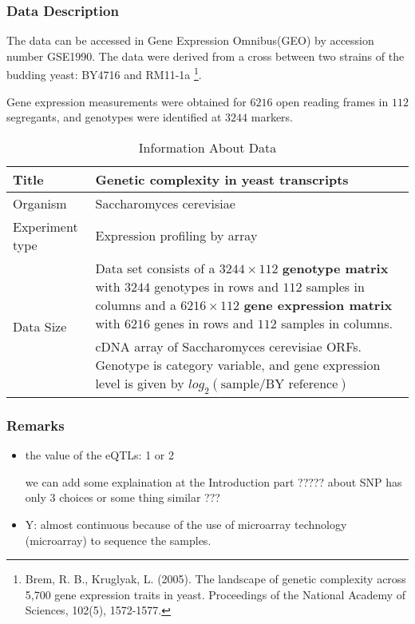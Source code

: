 \begin{frame}\frametitle{Data Description}
    The data can be accessed in Gene Expression Omnibus(GEO) by accession number GSE1990. 
    The data were derived from a cross between two strains of the budding yeast: BY4716 and RM11-1a \footnote[1]{Brem, R. B., Kruglyak, L. (2005). The landscape of genetic complexity across 5,700 gene expression traits in yeast. Proceedings of the National Academy of Sciences, 102(5), 1572-1577.}. 

    Gene expression measurements were obtained for $6216$ open reading frames in $112$ segregants, and genotypes were identified at $3244$ markers. 

\end{frame}

\begin{frame}
    \begin{table}[h]
        \centering
        \begin{tabular}{|l|p{7cm}|}
            \hline
            Title                           &   Genetic complexity in yeast transcripts \\ \hline
            Organism                        &   Saccharomyces cerevisiae                \\ \hline
            Experiment type                 &   Expression profiling by array           \\ \hline
            \multirow{4}{*}{Data Size}      &   Data set consists of a $3244\times112$ \textbf{genotype matrix} with $3244$ genotypes in rows and $112$ samples in columns and a $6216\times112$ \textbf{gene expression matrix} with $6216$ genes in rows and $112$ samples in columns.  \\ \hline
            \multirow{3}{*}{Description}    &   cDNA array of Saccharomyces cerevisiae ORFs. Genotype is category variable, and gene expression level is given by  $log_2(\text{sample} / \text{BY reference})$\\ 
            \hline
        \end{tabular}
        \caption{Information About Data}
    \end{table}

\end{frame}

\begin{frame}\frametitle{Remarks}
    \begin{itemize}
        \item the value of the eQTLs: 1 or 2
    
        we can add some explaination at the Introduction part ????? about SNP has only 3 choices or some thing similar ???

        \item Y: almost continuous because of the use of microarray technology (microarray) to sequence the samples.
      
    \end{itemize}
\end{frame}

